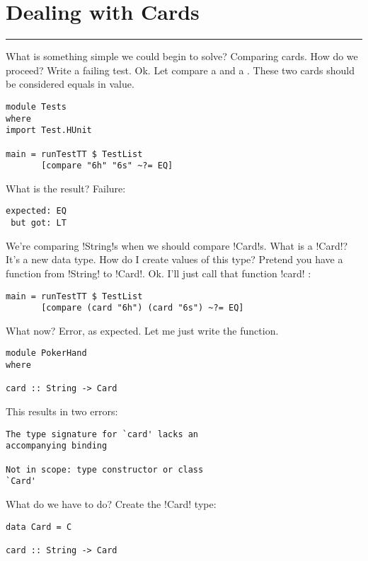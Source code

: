 \newpage
\section{Dealing with Cards} %
\vspace{10cm}
\hrule

\lhQ What is something simple we could begin to solve?
\lhA Comparing cards.
\lhN How do we proceed?
\lhA Write a failing test.
\lhN Ok. Let compare a  and a . These two cards should be considered equals in value.
\begin{lstlisting}[frame=single]
module Tests
where 
import Test.HUnit

main = runTestTT $ TestList 
       [compare "6h" "6s" ~?= EQ]
\end{lstlisting} %
What is the result?
\lhA \failure Failure: 
\begin{verbatim}
expected: EQ
 but got: LT
\end{verbatim}
We're comparing \il!String!s when we should compare \il!Card!s.
\lhN What is a \il!Card!?
\lhA It's a new data type.
\lhN How do I create values of this type?
\lhA Pretend you have a function from \il!String! to \il!Card!.
\lhN Ok. I'll just call that function \il!card! :
\begin{lstlisting}[frame=single]
main = runTestTT $ TestList 
       [compare (card "6h") (card "6s") ~?= EQ] 
\end{lstlisting} %
What now?
\lhA \error Error, as expected. Let me just write the function.
\begin{lstlisting}[frame=single]
module PokerHand
where

card :: String -> Card
\end{lstlisting}
\lhN \error This results in two errors: 
\begin{verbatim}
The type signature for `card' lacks an 
accompanying binding

Not in scope: type constructor or class 
`Card'
\end{verbatim}
What do we have to do?
\lhA \error Create the \il!Card! type:
\begin{lstlisting}[frame=single]
data Card = C 

card :: String -> Card
\end{lstlisting}
